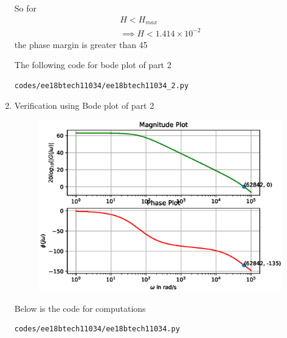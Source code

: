 \begin{enumerate}[label=\thesubsection.\arabic*.,ref=\thesubsection.\theenumi]
So for 
\begin{align}
    H < H_{max} 
    \\
    \implies H < 1.414 \times 10^{-2}
\end{align}
the phase margin is greater than 45\degree

The following code for bode plot of part 2
\begin{lstlisting}
codes/ee18btech11034/ee18btech11034_2.py
\end{lstlisting}

\item Verification using Bode plot of part 2
\begin{figure}[!h]
\centering
\includegraphics[width=\columnwidth]{./figs/ee18btech11034/ee18btech11034_2.eps}
\caption{}
\label{fig:ee18btech11034_2}
\end{figure}

Below is the code for computations
\begin{lstlisting}
codes/ee18btech11034/ee18btech11034.py
\end{lstlisting}

\end{enumerate}